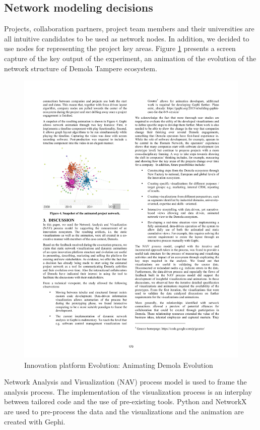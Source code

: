 \subsection{Network modeling decisions}

Projects, collaboration partners, project team members and their universities are all intuitive candidates to be used as network nodes. In addition, we decided to use nodes for representing the project key areas. Figure \ref{fig:animating-demola} presents a screen capture of the key output of the experiment, an animation of the evolution of the network structure of Demola Tampere ecosystem.

\begin{figure}[htb]
\centering
\includegraphics[width=12cm]{figure/Animating-Demola-Evolution.pdf}
\caption{Innovation platform Evolution: Animating Demola Evolution \citep{Huhtamaki2013ProcessDemola}}
\label{fig:animating-demola}
\end{figure}

Network Analysis and Visualization (NAV) process model \citep{Hansen2012DoData} is used to frame the analysis process. The implementation of the visualization process is an interplay between tailored code and the use of pre-existing tools. Python and NetworkX are used to pre-process the data and the visualizations and the animation are created with Gephi.

